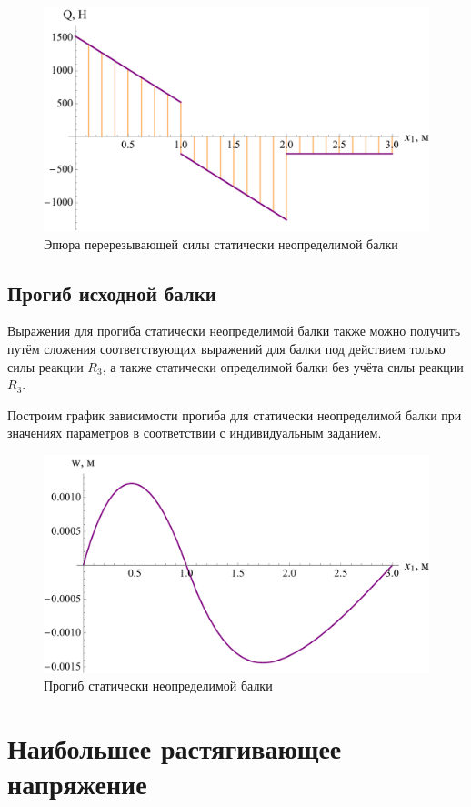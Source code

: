 \documentclass[12pt, a4paper]{article}
\begin{document}
	\begin{figure}[!h]
		\centering
		\includegraphics[width=0.75\linewidth]{plot-11}
		\caption{Эпюра перерезывающей силы статически неопределимой балки}
	\end{figure}
	
	\subsection{Прогиб исходной балки}
	
	Выражения для прогиба статически неопределимой балки также можно получить путём сложения соответствующих выражений для балки под действием только силы реакции $R_3$, а также статически определимой балки без учёта силы реакции $R_3$. 
	
	Построим график зависимости прогиба для статически неопределимой балки при значениях параметров в соответствии с индивидуальным заданием.
	
	\begin{figure}[!h]
		\centering
		\includegraphics[width=0.75\linewidth]{plot-12}
		\caption{Прогиб статически неопределимой балки}
	\end{figure}
	
	\section{Наибольшее растягивающее напряжение}
	
\end{document}

